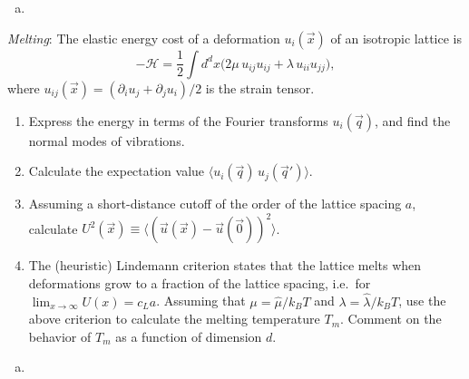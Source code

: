 \begin{solution}
    \begin{enumerate}[(a)]
        \item
    \end{enumerate}
\end{solution}

\begin{problem}
    \textit{Melting}: The elastic energy cost of a deformation $u_i(\vec{x})$ of an isotropic lattice is
    \[
        -\mathcal{H} = \frac{1}{2}\int d^dx\bigl(2\mu\, u_{ij}u_{ij} + \lambda\, u_{ii}u_{jj}\bigr),
    \]
    where $u_{ij}(\vec{x}) = (\partial_i u_j + \partial_j u_i)/2$ is the strain tensor.

    \begin{enumerate}
        \item[(a)] Express the energy in terms of the Fourier transforms $u_i(\vec{q})$, and find the normal modes of vibrations.

        \item[(b)] Calculate the expectation value $\langle u_i(\vec{q})\,u_j(\vec{q}')\rangle$.

        \item[(c)] Assuming a short-distance cutoff of the order of the lattice spacing $a$, calculate $U^2(\vec{x}) \equiv \langle(\vec{u}(\vec{x}) - \vec{u}(\vec{0}))^2\rangle$.

        \item[(d)] The (heuristic) Lindemann criterion states that the lattice melts when deformations grow to a fraction of the lattice spacing, i.e.\ for $\lim_{x\to\infty} U(x) = c_L a$. Assuming that $\mu = \hat{\mu}/k_BT$ and $\lambda = \hat{\lambda}/k_BT$, use the above criterion to calculate the melting temperature $T_m$. Comment on the behavior of $T_m$ as a function of dimension $d$.
    \end{enumerate}
\end{problem}

\begin{solution}
    \begin{enumerate}[(a)]
        \item
    \end{enumerate}
\end{solution}
